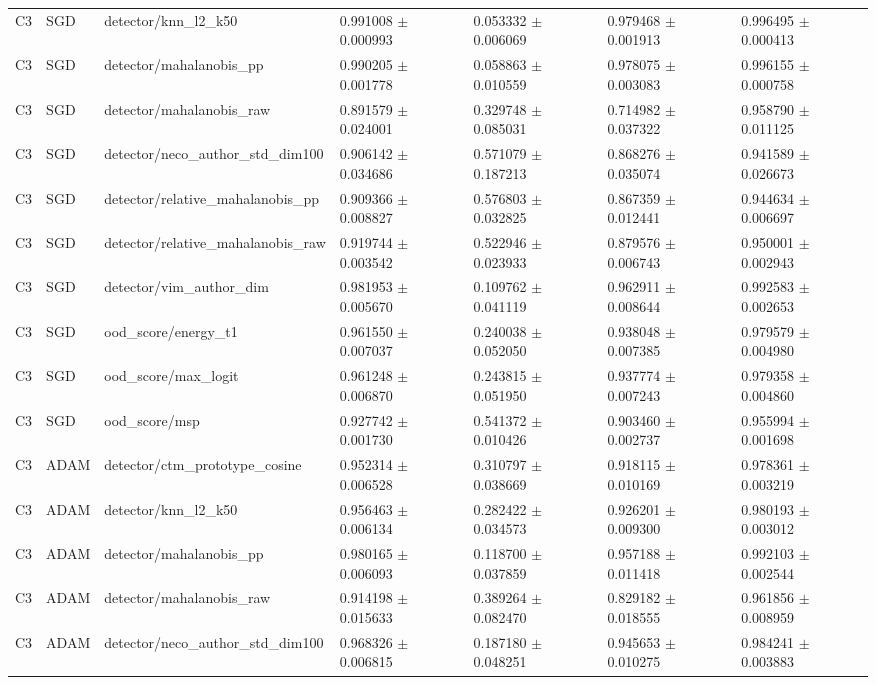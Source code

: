 \begin{longtable}{lllllll}
C3 & SGD & detector/knn\_l2\_k50 & 0.991008 $\pm$ 0.000993 & 0.053332 $\pm$ 0.006069 & 0.979468 $\pm$ 0.001913 & 0.996495 $\pm$ 0.000413 \\
C3 & SGD & detector/mahalanobis\_pp & 0.990205 $\pm$ 0.001778 & 0.058863 $\pm$ 0.010559 & 0.978075 $\pm$ 0.003083 & 0.996155 $\pm$ 0.000758 \\
C3 & SGD & detector/mahalanobis\_raw & 0.891579 $\pm$ 0.024001 & 0.329748 $\pm$ 0.085031 & 0.714982 $\pm$ 0.037322 & 0.958790 $\pm$ 0.011125 \\
C3 & SGD & detector/neco\_author\_std\_dim100 & 0.906142 $\pm$ 0.034686 & 0.571079 $\pm$ 0.187213 & 0.868276 $\pm$ 0.035074 & 0.941589 $\pm$ 0.026673 \\
C3 & SGD & detector/relative\_mahalanobis\_pp & 0.909366 $\pm$ 0.008827 & 0.576803 $\pm$ 0.032825 & 0.867359 $\pm$ 0.012441 & 0.944634 $\pm$ 0.006697 \\
C3 & SGD & detector/relative\_mahalanobis\_raw & 0.919744 $\pm$ 0.003542 & 0.522946 $\pm$ 0.023933 & 0.879576 $\pm$ 0.006743 & 0.950001 $\pm$ 0.002943 \\
C3 & SGD & detector/vim\_author\_dim & 0.981953 $\pm$ 0.005670 & 0.109762 $\pm$ 0.041119 & 0.962911 $\pm$ 0.008644 & 0.992583 $\pm$ 0.002653 \\
C3 & SGD & ood\_score/energy\_t1 & 0.961550 $\pm$ 0.007037 & 0.240038 $\pm$ 0.052050 & 0.938048 $\pm$ 0.007385 & 0.979579 $\pm$ 0.004980 \\
C3 & SGD & ood\_score/max\_logit & 0.961248 $\pm$ 0.006870 & 0.243815 $\pm$ 0.051950 & 0.937774 $\pm$ 0.007243 & 0.979358 $\pm$ 0.004860 \\
C3 & SGD & ood\_score/msp & 0.927742 $\pm$ 0.001730 & 0.541372 $\pm$ 0.010426 & 0.903460 $\pm$ 0.002737 & 0.955994 $\pm$ 0.001698 \\
C3 & ADAM & detector/ctm\_prototype\_cosine & 0.952314 $\pm$ 0.006528 & 0.310797 $\pm$ 0.038669 & 0.918115 $\pm$ 0.010169 & 0.978361 $\pm$ 0.003219 \\
C3 & ADAM & detector/knn\_l2\_k50 & 0.956463 $\pm$ 0.006134 & 0.282422 $\pm$ 0.034573 & 0.926201 $\pm$ 0.009300 & 0.980193 $\pm$ 0.003012 \\
C3 & ADAM & detector/mahalanobis\_pp & 0.980165 $\pm$ 0.006093 & 0.118700 $\pm$ 0.037859 & 0.957188 $\pm$ 0.011418 & 0.992103 $\pm$ 0.002544 \\
C3 & ADAM & detector/mahalanobis\_raw & 0.914198 $\pm$ 0.015633 & 0.389264 $\pm$ 0.082470 & 0.829182 $\pm$ 0.018555 & 0.961856 $\pm$ 0.008959 \\
C3 & ADAM & detector/neco\_author\_std\_dim100 & 0.968326 $\pm$ 0.006815 & 0.187180 $\pm$ 0.048251 & 0.945653 $\pm$ 0.010275 & 0.984241 $\pm$ 0.003883 \\

\end{longtable}

